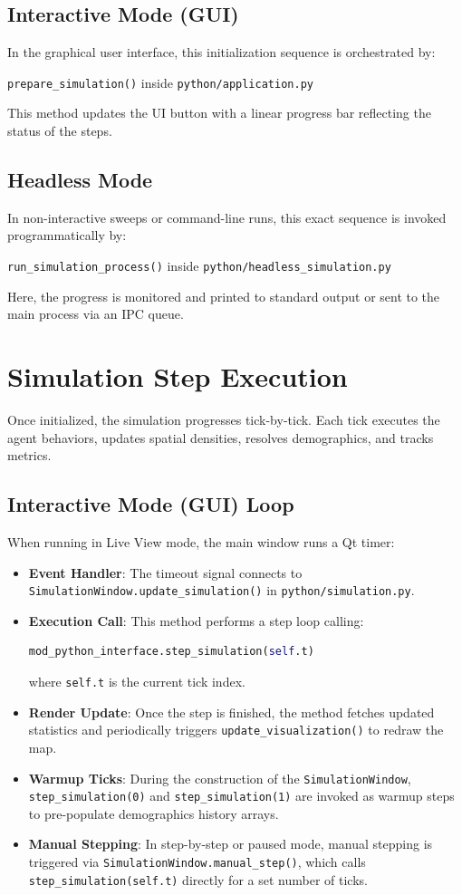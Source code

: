 \documentclass[14pt,a4paper]{extreport}
\begin{document}
\subsection{Interactive Mode (GUI)}
In the graphical user interface, this initialization sequence is orchestrated by:
\begin{center}
    \texttt{prepare\_simulation()} inside \texttt{python/application.py}
\end{center}
This method updates the UI button with a linear progress bar reflecting the status of the steps.

\subsection{Headless Mode}
In non-interactive sweeps or command-line runs, this exact sequence is invoked programmatically by:
\begin{center}
    \texttt{run\_simulation\_process()} inside \texttt{python/headless\_simulation.py}
\end{center}
Here, the progress is monitored and printed to standard output or sent to the main process via an IPC queue.

\section{Simulation Step Execution}
Once initialized, the simulation progresses tick-by-tick. Each tick executes the agent behaviors, updates spatial densities, resolves demographics, and tracks metrics.

\subsection{Interactive Mode (GUI) Loop}
When running in Live View mode, the main window runs a Qt timer:
\begin{itemize}
    \item \textbf{Event Handler}: The timeout signal connects to \texttt{SimulationWindow.update\_simulation()} in \texttt{python/simulation.py}.
    \item \textbf{Execution Call}: This method performs a step loop calling:
    \begin{lstlisting}[language=Python]
    mod_python_interface.step_simulation(self.t)
    \end{lstlisting}
    where \texttt{self.t} is the current tick index.
    \item \textbf{Render Update}: Once the step is finished, the method fetches updated statistics and periodically triggers \texttt{update\_visualization()} to redraw the map.
    \item \textbf{Warmup Ticks}: During the construction of the \texttt{SimulationWindow}, \texttt{step\_simulation(0)} and \texttt{step\_simulation(1)} are invoked as warmup steps to pre-populate demographics history arrays.
    \item \textbf{Manual Stepping}: In step-by-step or paused mode, manual stepping is triggered via \texttt{SimulationWindow.manual\_step()}, which calls \texttt{step\_simulation(self.t)} directly for a set number of ticks.
\end{itemize}
\end{document}

